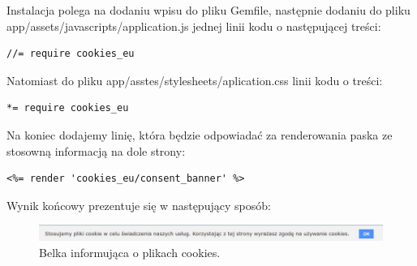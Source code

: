 \documentclass[openright]{xmgr}
\begin{document}
Instalacja polega na dodaniu wpisu do pliku Gemfile, następnie dodaniu do pliku app/assets/javascripts/application.js jednej linii kodu o następującej treści:
\begin{lstlisting}[language=ruby2, caption={Kod odpowiadający za dodanie bibliotek javascript}]
//= require cookies_eu
\end{lstlisting}
Natomiast do pliku app/asstes/stylesheets/aplication.css linii kodu o treści:
\begin{lstlisting}[language=ruby2, caption={Kod odpowiadający za dodanie bibliotek kaskadowych arkuszy stylów}]
*= require cookies_eu
\end{lstlisting}
Na koniec dodajemy linię, która będzie odpowiadać za renderowania paska ze stosowną informacją na dole strony:
\begin{lstlisting}[language=ruby2, caption={Kod renderujący pasek z informacją o ciasteczkach}]
<%= render 'cookies_eu/consent_banner' %>
\end{lstlisting}

Wynik końcowy prezentuje się w następujący sposób:
\begin{figure}[!tbh]
\centering
\includegraphics[width=\linewidth]{fig/cookies}
\caption{Belka informująca o plikach cookies.}
\end{figure}
\end{document}
